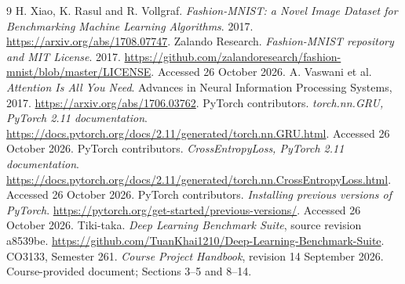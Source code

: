 \clearpage
\begin{thebibliography}{9}
H. Xiao, K. Rasul and R. Vollgraf.
\emph{Fashion-MNIST: a Novel Image Dataset for Benchmarking Machine Learning Algorithms}.
2017. \url{https://arxiv.org/abs/1708.07747}.
Zalando Research. \emph{Fashion-MNIST repository and MIT License}.
2017. \url{https://github.com/zalandoresearch/fashion-mnist/blob/master/LICENSE}.
Accessed 26 October 2026.
A. Vaswani et al. \emph{Attention Is All You Need}.
Advances in Neural Information Processing Systems, 2017.
\url{https://arxiv.org/abs/1706.03762}.
PyTorch contributors. \emph{torch.nn.GRU, PyTorch 2.11 documentation}.
\url{https://docs.pytorch.org/docs/2.11/generated/torch.nn.GRU.html}.
Accessed 26 October 2026.
PyTorch contributors. \emph{CrossEntropyLoss, PyTorch 2.11 documentation}.
\url{https://docs.pytorch.org/docs/2.11/generated/torch.nn.CrossEntropyLoss.html}.
Accessed 26 October 2026.
PyTorch contributors. \emph{Installing previous versions of PyTorch}.
\url{https://pytorch.org/get-started/previous-versions/}. Accessed 26 October 2026.
Tiki-taka. \emph{Deep Learning Benchmark Suite}, source revision a8539be.
\url{https://github.com/TuanKhai1210/Deep-Learning-Benchmark-Suite}.
CO3133, Semester 261. \emph{Course Project Handbook}, revision 14 September 2026.
Course-provided document; Sections 3--5 and 8--14.
\end{thebibliography}
